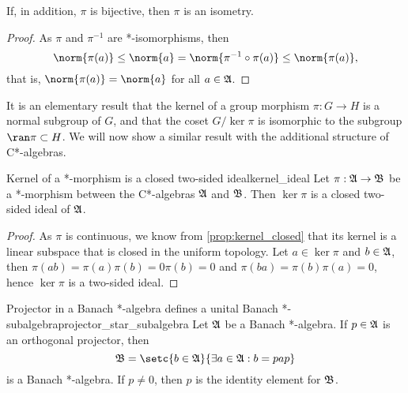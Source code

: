 \begin{corollary}
    If, in addition, \(\pi\) is bijective, then \(\pi\) is an isometry.
\end{corollary}
\begin{proof}
    As \(\pi\) and \(\pi^{-1}\) are *-isomorphisms, then
    \begin{equation*}
        \norm{\pi(a)} \leq \norm{a} = \norm{\pi^{-1}\circ \pi(a)} \leq \norm{\pi(a)},
    \end{equation*}
    that is, \(\norm{\pi(a)} = \norm{a}\) for all \(a \in \mathfrak{A}\).
\end{proof}

It is an elementary result that the kernel of a group morphism \(\pi : G \to H\) is a normal subgroup of \(G\), and that the coset \(G / \ker\pi\) is isomorphic to the subgroup \(\ran\pi \subset H\). We will now show a similar result with the additional structure of C*-algebras.
\begin{proposition}{Kernel of a *-morphism is a closed two-sided ideal}{kernel_ideal}
    Let \(\pi : \mathfrak{A} \to \mathfrak{B}\) be a *-morphism between the C*-algebras \(\mathfrak{A}\) and \(\mathfrak{B}\). Then \(\ker \pi\) is a closed two-sided ideal of \(\mathfrak{A}\).
\end{proposition}
\begin{proof}
    As \(\pi\) is continuous, we know from \cref{prop:kernel_closed} that its kernel is a linear subspace that is closed in the uniform topology. Let \(a \in \ker\pi\) and \(b \in \mathfrak{A}\), then \(\pi(ab) = \pi(a)\pi(b) = 0\pi(b) = 0\) and \(\pi(ba) = \pi(b)\pi(a) = 0\), hence \(\ker\pi\) is a two-sided ideal.
\end{proof}
\begin{lemma}{Projector in a Banach *-algebra defines a unital Banach *-subalgebra}{projector_star_subalgebra}
    Let \(\mathfrak{A}\) be a Banach *-algebra. If \(p \in \mathfrak{A}\) is an orthogonal projector, then
    \begin{equation*}
        \algebra{B} = \setc{b \in \algebra{A}}{\exists a \in \algebra{A} : b = pap}
    \end{equation*}
    is a Banach *-algebra. If \(p \neq 0\), then \(p\) is the identity element for \(\mathfrak{B}\).
\end{lemma}
